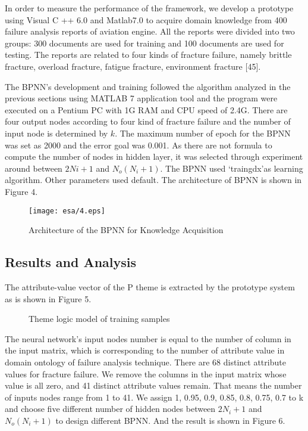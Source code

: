 \documentclass{elsarticle}
\begin{document}
In order to measure the performance of the framework, we develop a
prototype using Visual C ++ 6.0 and Matlab7.0 to acquire domain
knowledge from 400 failure analysis reports of aviation engine. All
the reports were divided into two groups: 300 documents are used for
training and 100 documents are used for testing. The reports are
related to four kinds of fracture failure, namely brittle fracture,
overload fracture, fatigue fracture, environment fracture
[45]\cite{medema}.

The BPNN’s development and training followed the algorithm analyzed in
the previous sections using MATLAB 7 application tool and the program
were executed on a Pentium PC with 1G RAM and CPU speed of 2.4G. There
are four output nodes according to four kind of fracture failure and
the number of input node is determined by $k$. The maximum number of
epoch for the BPNN was set as 2000 and the error goal was 0.001. As
there are not formula to compute the number of nodes in hidden layer,
it was selected through experiment around between $2Ni+1$ and $N_o(N_i
+1)$. The BPNN used ‘traingdx’as learning algorithm. Other parameters
used default. The architecture of BPNN is shown in Figure 4.
\begin{figure}[htb]
  \centering
  \texttt{[image: esa/4.eps]}
  \caption{Architecture of the BPNN for Knowledge Acquisition
  }
\label{fig:4}
\end{figure}

\subsection{Results and Analysis
}
\label{sec:results-analysis-}

The attribute-value vector of the P theme is extracted by the prototype system as is shown in Figure 5.

 \begin{figure}[htb]
  \centering
  \caption{Theme logic model of training samples}
\label{fig:5}
\end{figure}

The neural network’s input nodes number is equal to the number of column in the input matrix, which is corresponding to the number of attribute value in domain ontology of failure analysis technique. There are 68 distinct attribute values for fracture failure. We remove the columns in the input matrix whose value is all zero, and 41 distinct attribute values remain. That means the number of inputs nodes range from 1 to 41. We assign 1, 0.95, 0.9, 0.85, 0.8, 0.75, 0.7 to k and choose five different number of hidden nodes between $2N_i+1$ and $N_o(N_i +1)$ to design different BPNN. And the result is shown in Figure 6.
\end{document}
